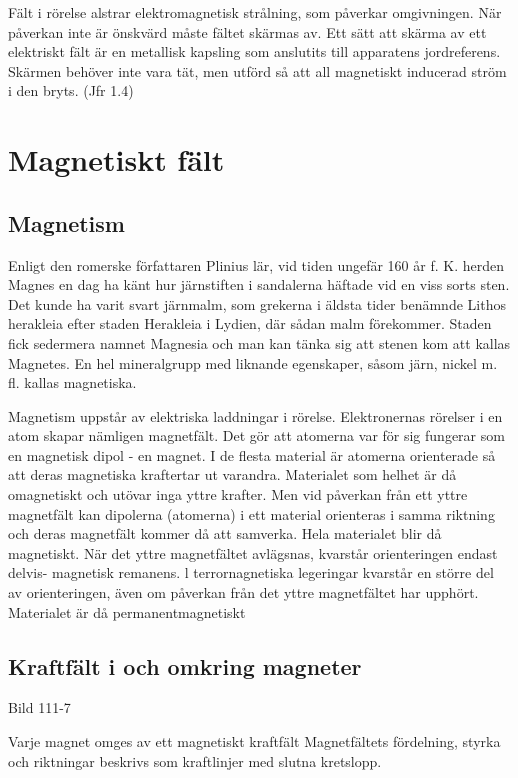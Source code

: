 Fält i rörelse alstrar elektromagnetisk strålning, som påverkar omgivningen. När
påverkan inte är önskvärd måste fältet skärmas av. Ett sätt att skärma av ett elektriskt
fält är en metallisk kapsling som anslutits till apparatens jordreferens. Skärmen behöver
inte vara tät, men utförd så att all magnetiskt inducerad ström i den bryts. (Jfr 1.4)

\cleardoublepage

\section{Magnetiskt fält}

\subsection{Magnetism}

Enligt den romerske författaren Plinius lär, vid tiden ungefär 160 år f. K. herden Magnes
en dag ha känt hur järnstiften i sandalerna häftade vid en viss sorts sten. Det kunde ha
varit svart järnmalm, som grekerna i äldsta tider benämnde Lithos herakleia efter staden
Herakleia i Lydien, där sådan malm förekommer. Staden fick sedermera namnet Magnesia och
man kan tänka sig att stenen kom att kallas Magnetes. En hel mineralgrupp med liknande
egenskaper, såsom järn, nickel m. fl. kallas magnetiska.

Magnetism uppstår av elektriska laddningar i rörelse. Elektronernas rörelser i en atom
skapar nämligen magnetfält. Det gör att atomerna var för sig fungerar som en magnetisk
dipol - en magnet. I de flesta material är atomerna orienterade så att deras magnetiska
kraftertar ut varandra. Materialet som helhet är då omagnetiskt och utövar inga yttre
krafter. Men vid påverkan från ett yttre magnetfält kan dipolerna (atomerna) i ett
material orienteras i samma riktning och deras magnetfält kommer då att
samverka. Hela materialet blir då magnetiskt. När det yttre magnetfältet avlägsnas,
kvarstår orienteringen endast delvis- magnetisk remanens. l terrornagnetiska legeringar
kvarstår en större del av orienteringen, även om påverkan från det yttre magnetfältet har
upphört. Materialet är då permanentmagnetiskt

\subsection{Kraftfält i och omkring magneter}

Bild 111-7

Varje magnet omges av ett magnetiskt kraftfält Magnetfältets fördelning, styrka och
riktningar beskrivs som kraftlinjer med slutna kretslopp.

